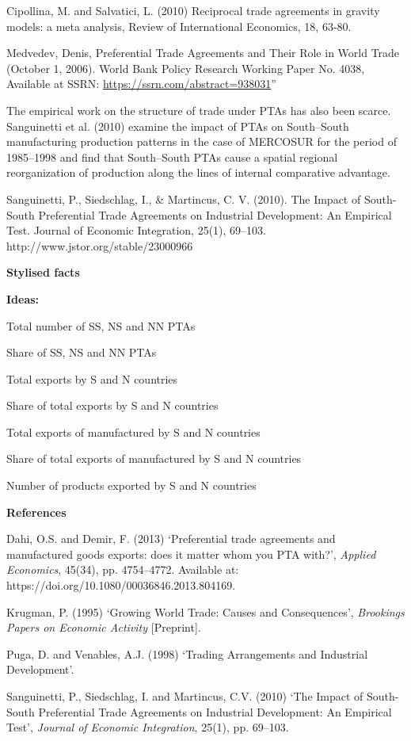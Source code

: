 \documentclass{article}%
\begin{document}
Cipollina, M. and Salvatici, L. (2010) Reciprocal trade agreements in
gravity models: a meta analysis, Review of International Economics, 18,
63-80.

Medvedev, Denis, Preferential Trade Agreements and Their Role in World
Trade (October 1, 2006). World Bank Policy Research Working Paper No.
4038, Available at SSRN: \url{https://ssrn.com/abstract=938031}''

The empirical work on the structure of trade under PTAs has also been
scarce. Sanguinetti et al. (2010) examine the impact of PTAs on
South--South manufacturing production patterns in the case of MERCOSUR
for the period of 1985--1998 and find that South--South PTAs cause a
spatial regional reorganization of production along the lines of
internal comparative advantage.

Sanguinetti, P., Siedschlag, I., \& Martincus, C. V. (2010). The Impact
of South-South Preferential Trade Agreements on Industrial Development:
An Empirical Test. Journal of Economic Integration, 25(1), 69--103.
http://www.jstor.org/stable/23000966

\textbf{Stylised facts}

\textbf{Ideas:}

Total number of SS, NS and NN PTAs

Share of SS, NS and NN PTAs

Total exports by S and N countries

Share of total exports by S and N countries

Total exports of manufactured by S and N countries

Share of total exports of manufactured by S and N countries

Number of products exported by S and N countries

\textbf{References}

Dahi, O.S. and Demir, F. (2013) `Preferential trade agreements and
manufactured goods exports: does it matter whom you PTA with?',
\emph{Applied Economics}, 45(34), pp. 4754--4772. Available at:
https://doi.org/10.1080/00036846.2013.804169.

Krugman, P. (1995) `Growing World Trade: Causes and Consequences',
\emph{Brookings Papers on Economic Activity} {[}Preprint{]}.

Puga, D. and Venables, A.J. (1998) `Trading Arrangements and Industrial
Development'.

Sanguinetti, P., Siedschlag, I. and Martincus, C.V. (2010) `The Impact
of South-South Preferential Trade Agreements on Industrial Development:
An Empirical Test', \emph{Journal of Economic Integration}, 25(1), pp.
69--103.
\end{document}
